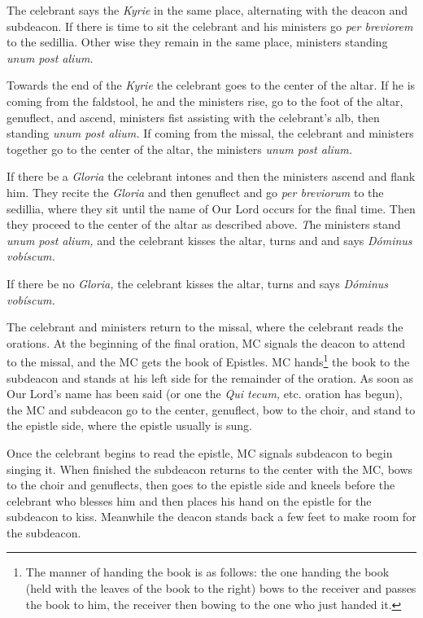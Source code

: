 \documentclass[letterpaper, twocolumn]{article}
\begin{document}
	\rubric The celebrant says the \textit{Kyrie} in the same place,
	alternating with the deacon and subdeacon. If there is time to sit the
	celebrant and his ministers go \textit{per breviorem} to the sedillia.
	Other wise they remain in the same place, ministers standing \textit{unum
	post alium.}

	\rubric Towards the end of the \textit{Kyrie} the celebrant goes to the
	center of the altar. If he is coming from the faldstool, he and the
	ministers rise, go to the foot of the altar, genuflect, and ascend,
	ministers fist assisting with the celebrant's alb, then standing
	\textit{unum post alium.} If coming from the missal, the celebrant and
	ministers together go to the center of the altar, the ministers
	\textit{unum post alium.}

	\rubric If there be a \textit{Gloria} the celebrant intones and then the
	ministers ascend and flank him. They recite the \textit{Gloria} and then
	genuflect and go \textit{per breviorum} to the sedillia, where they sit
	until the name of Our Lord occurs for the final time. Then they proceed to
	the center of the altar as described above. \textit The ministers stand
	\textit{unum post alium,} and the celebrant kisses the altar, turns and and
	says \textit{Dóminus vobíscum.}

	\rubric If there be no \textit{Gloria,} the celebrant kisses the altar,
	turns and says \textit{Dóminus vobíscum.} 

	\rubric The celebrant and ministers return to the missal, where the
	celebrant reads the orations. At the beginning of the final oration, MC
	signals the deacon to attend to the missal, and the MC gets the book of
	Epistles. MC hands\footnote{The manner of handing the book is as follows:
	the one handing the book (held with the leaves of the book to the right)
	bows to the receiver and passes the book to him, the receiver then bowing
	to the one who just handed it.} the book to the subdeacon and stands at his
	left side for the remainder of the oration. As soon as Our Lord's name has
	been said (or one the \textit{Qui tecum,} etc. oration has begun), the MC
	and subdeacon go to the center, genuflect, bow to the choir, and stand to
	the epistle side, where the epistle usually is sung.

	\rubric Once the celebrant begins to read the epistle, MC signals subdeacon
	to begin singing it. When finished the subdeacon returns to the center with
	the MC, bows to the choir and genuflects, then goes to the epistle side and
	kneels before the celebrant who blesses him and then places his hand on the
	epistle for the subdeacon to kiss. Meanwhile the deacon stands back a few
	feet to make room for the subdeacon.
\end{document}
